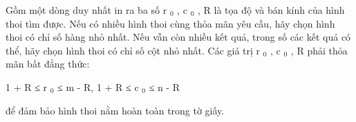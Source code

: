 Gồm một dòng duy nhất in ra ba số r   $_    0   $   , c   $_    0   $   , R là tọa độ và bán kính của hình thoi tìm được. Nếu có nhiều hình thoi cùng thỏa mãn yêu cầu, hãy chọn hình thoi có chỉ số hàng nhỏ nhất. Nếu vẫn còn nhiều kết quả, trong số các kết quả có thể, hãy chọn hình thoi có chỉ số cột nhỏ nhất. Các giá trị r   $_    0   $   , c   $_    0   $   , R phải thỏa mãn bất đẳng thức:  

   1 + R ≤ r   $_    0   $   ≤ m - R, 1 + R ≤ c   $_    0   $   ≤ n - R  

   để đảm bảo hình thoi nằm hoàn toàn trong tờ giấy.